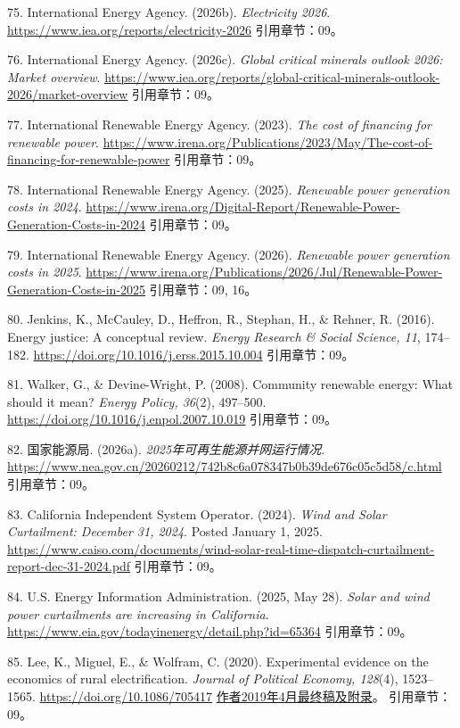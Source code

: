 \documentclass[UTF8,fontset=windows,12pt,a4paper,oneside,openany]{ctexbook}
\begin{document}
75. International Energy Agency. (2026b). \emph{Electricity 2026}. \url{https://www.iea.org/reports/electricity-2026}
引用章节：09。

76. International Energy Agency. (2026c). \emph{Global critical minerals outlook 2026: Market overview}. \url{https://www.iea.org/reports/global-critical-minerals-outlook-2026/market-overview}
引用章节：09。

77. International Renewable Energy Agency. (2023). \emph{The cost of financing for renewable power}. \url{https://www.irena.org/Publications/2023/May/The-cost-of-financing-for-renewable-power}
引用章节：09。

78. International Renewable Energy Agency. (2025). \emph{Renewable power generation costs in 2024}. \url{https://www.irena.org/Digital-Report/Renewable-Power-Generation-Costs-in-2024}
引用章节：09。

79. International Renewable Energy Agency. (2026). \emph{Renewable power generation costs in 2025}. \url{https://www.irena.org/Publications/2026/Jul/Renewable-Power-Generation-Costs-in-2025}
引用章节：09, 16。

80. Jenkins, K., McCauley, D., Heffron, R., Stephan, H., \& Rehner, R. (2016). Energy justice: A conceptual review. \emph{Energy Research \& Social Science, 11}, 174–182. \url{https://doi.org/10.1016/j.erss.2015.10.004}
引用章节：09。

81. Walker, G., \& Devine-Wright, P. (2008). Community renewable energy: What should it mean? \emph{Energy Policy, 36}(2), 497–500. \url{https://doi.org/10.1016/j.enpol.2007.10.019}
引用章节：09。

82. 国家能源局. (2026a). \emph{2025年可再生能源并网运行情况}. \url{https://www.nea.gov.cn/20260212/742b8c6a078347b0b39de676c05c5d58/c.html}
引用章节：09。

83. California Independent System Operator. (2024). \emph{Wind and Solar Curtailment: December 31, 2024}. Posted January 1, 2025. \url{https://www.caiso.com/documents/wind-solar-real-time-dispatch-curtailment-report-dec-31-2024.pdf}
引用章节：09。

84. U.S. Energy Information Administration. (2025, May 28). \emph{Solar and wind power curtailments are increasing in California}. \url{https://www.eia.gov/todayinenergy/detail.php?id=65364}
引用章节：09。

85. Lee, K., Miguel, E., \& Wolfram, C. (2020). Experimental evidence on the economics of rural electrification. \emph{Journal of Political Economy, 128}(4), 1523–1565. \url{https://doi.org/10.1086/705417} \href{https://emiguel.econ.berkeley.edu/assets/miguel_research/74/REPP_2019-04-25-FINAL-All.pdf}{作者2019年4月最终稿及附录}。
引用章节：09。
\end{document}
